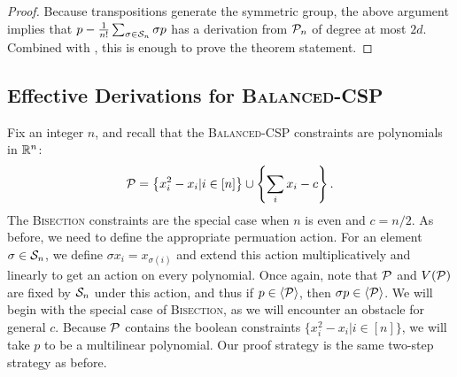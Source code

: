 \begin{proof}
Because transpositions generate the symmetric group, the above argument implies that $p - \frac{1}{n!}\sum_{\sigma \in \mathcal S_n} \sigma p$ has a derivation from $\mathcal P_n$ of degree at most $2d$. Combined with , this is enough to prove the theorem statement. 
\end{proof}

\subsection{Effective Derivations for \textsc{Balanced-CSP}}
Fix an integer $n$, and recall that the \textsc{Balanced-CSP} constraints are polynomials in $\mathbb R^n$:
\[\mathcal P = \left\{x_i^2 - x_i| i \in [n]\right\} \cup \left\{\sum_i x_i - c\right\}.\]
The \textsc{Bisection} constraints are the special case when $n$ is even and $c = n/2$. 
As before, we need to define the appropriate permuation action. For an element $\sigma \in \mathcal S_n$, we define $\sigma x_i = x_{\sigma(i)}$ and extend this action multiplicatively and linearly to get an action on every polynomial. 
Once again, note that $\mathcal P$ and $V(\mathcal P)$ are fixed by $\mathcal S_n$ under this action, and thus if $p \in \langle \mathcal P \rangle$, then $\sigma p \in \langle \mathcal P \rangle$. 
We will begin with the special case of \textsc{Bisection}, as we will encounter an obstacle for general $c$. 
Because $\mathcal P$ contains the boolean constraints $\{x_i^2 - x_i | i \in [n]\}$, we will take $p$ to be a multilinear polynomial. 
Our proof strategy is the same two-step strategy as before. 

